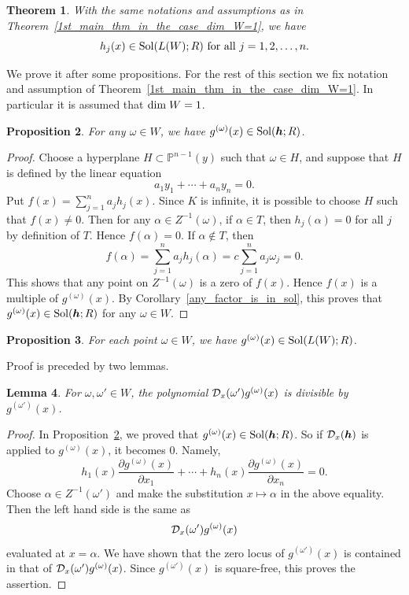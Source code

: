 \documentclass[12pt]{article}
\newtheorem{theorem}{Theorem}[section]
\newtheorem{lemma}[theorem]{Lemma}
\newtheorem{proposition}[theorem]{Proposition}
\theoremstyle{definition}
\theoremstyle{remark}
\def\dim{{\rm dim}}
\def\cD{{\cal D}}
\def\sol{{\rm Sol}}
\def\boldh{\mbox{\boldmath $h$}}
\def\pa{\partial}
\def\al{\alpha}
\def\om{\omega}
\newcommand {\PP}{\mathbb{P}}
\begin{document}
\begin{theorem} \label{2nd_main_thm_in_the_case_dim_W=1}   %
With the same notations and assumptions as in Theorem~\ref{1st_main_thm_in_the_case_dim_W=1}, 
we have
\[h_j(x) \in \sol(L(W);R) \  \mbox{for  all}\ j=1,2, \ldots, n. \] 
\end{theorem}

We prove it after some propositions.  For the rest of this section we 
fix notation and assumption of Theorem~\ref{1st_main_thm_in_the_case_dim_W=1}.
In particular it is  assumed  that $\dim \;W=1$.
 
\begin{proposition} \label{main_proposition_1}  %
For any $\om \in W$, we have $g^{(\om)}(x) \in \sol(\boldh; R)$. 
\end{proposition}
\begin{proof}
Choose a hyperplane $H \subset \PP ^{n-1}(y)$ such that $\om \in H$, and suppose that $H$ is defined by the linear equation 
\[a_1y_1 + \cdots + a_ny_n=0.\]  
Put $f(x)=\sum _{j=1}^na_jh_j(x)$.  Since $K$ is infinite, it is possible to choose $H$ such that $f(x) \neq 0$.  
Then for any $\al \in Z^{-1}(\omega)$, if $\al \in T$, then $h_j(\al)=0$ for all $j$ by definition  of $T$. 
Hence $f(\al)=0$.  If $\al \not \in T$, then 
\[f(\al)=\sum _{j=1}^n a_jh_j(\al)= c\sum _{j=1}^n a_j\om _j=0.\]
This shows that any point on $Z^{-1}(\om)$ is a zero of $f(x)$.  Hence $f(x)$  is a multiple of  $g^{(\om)}(x)$. 
By Corollary~\ref{any_factor_is_in_sol}, this proves that $g^{(\om)}(x) \in \sol(\boldh; R)$ for any $\om \in W$. 
\end{proof}

\begin{proposition} \label{main_proposition_2}   %
For each point $\om \in W$, we have $g^{(\om)}(x) \in \sol(L(W); R)$.  
\end{proposition}

Proof is preceded by two lemmas. 

\begin{lemma}   \label{technical_lemma_1}   %
For $\omega, \omega ' \in W$, the polynomial     
$\cD_x(\omega ')g^{(\omega)}(x)$ is divisible by  $g^{(\omega ')}(x)$. 
\end{lemma}

\begin{proof}
In Proposition~\ref{main_proposition_1}, we proved that $g^{(\omega)}(x) \in \sol(\boldh; R)$.
So if $\cD_x(\boldh)$ is applied to $g^{(\omega)}(x)$,  it becomes $0$.  
Namely, 
\[h_1(x)\frac{\pa g^{(\omega)}(x)}{\pa x_1}+ \cdots + h _n(x)\frac{\pa g^{(\omega)}(x)}{\pa x_n}=0. \] 
Choose $\al \in Z^{-1}(\om ')$ and make the substitution  $x \mapsto \al$ in the above equality.
Then the  left hand side  is the same as  
\[\cD_x(\om ')g^{(\om)}(x)\] evaluated at $x=\al$. 
We have shown that the zero locus of 
$g^{(\om ')}(x)$ is contained in that of $\cD_x(\om ')g^{(\om)}(x)$.  
Since $g^{(\om ')}(x)$ is square-free,  this proves the assertion.
\end{proof}
\end{document}
